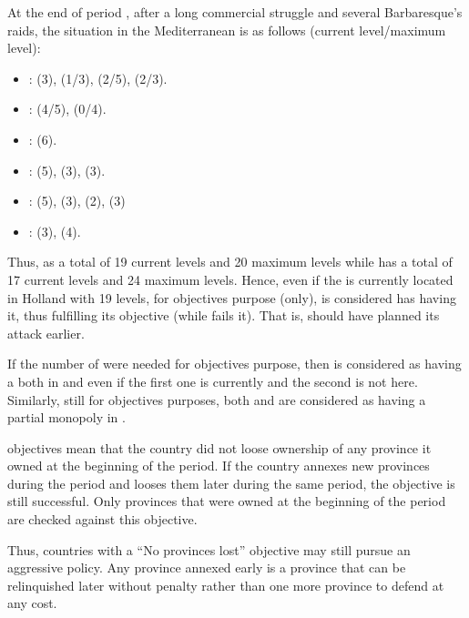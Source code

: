 \begin{exemple}
  At the end of period , after a long commercial struggle
  and several Barbaresque's raids, the situation in the Mediterranean is
  as follows (current level/maximum level):
  \begin{itemize}
  \item {}: \HOL (3), \HIS (1/3), \VEN (2/5), \FRA (2/3).
  \item {}: \HOL(4/5), \VEN (0/4).
  \item {}: \VEN (6).
  \item {}: \TUR (5), \VEN (3), \HOL (3).
  \item {}: \HOL (5), \VEN (3), \TUR (2), \FRA (3)
  \item {}: \VEN (3), \HOL (4).
  \end{itemize}
  Thus, \HOL as a total of 19 current levels and 20 maximum levels while
  \VEN has a total of 17 current levels and 24 maximum levels. Hence,
  even if the  is currently located in Holland with 19
  levels, for objectives purpose (only), \VEN is considered has having
  it, thus fulfilling its objective (while \HOL fails it). That is, \HOL
  should have planned its attack earlier.

  If the number of \TradeFLEET were needed for objectives purpose, then
  \VEN is considered as having a \TradeFLEET\faceplus both in 
  and  even if the first one is currently \Facemoins and
  the second is not here. Similarly, still for objectives purposes, both
  \HOL and \VEN are considered as having a partial monopoly in
  .
\end{exemple}

 objectives mean that the country did not loose
ownership of any province it owned at the beginning of the period.
\bparag If the country annexes new provinces during the period and
looses them later during the same period, the objective is still
successful. Only provinces that were owned at the beginning of the
period are checked against this objective.

\begin{designnote}
  Thus, countries with a ``No provinces lost'' objective may still
  pursue an aggressive policy. Any province annexed early is a province
  that can be relinquished later without penalty rather than one more
  province to defend at any cost.
\end{designnote}

